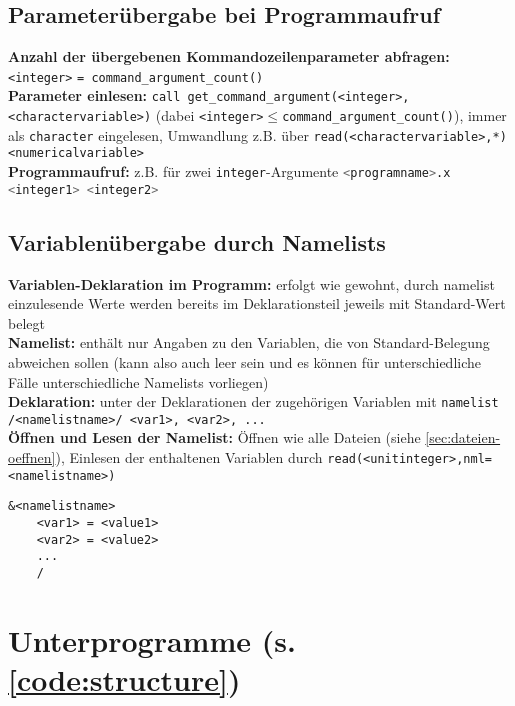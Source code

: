 \documentclass[a4paper, twocolumn]{scrarticle}
\begin{document}
\subsection{Parameterübergabe bei Programmaufruf}
\textbf{Anzahl der übergebenen Kommandozeilenparameter abfragen:} \lstinline|<integer>| \lstinline|= command_argument_count()|\\
\textbf{Parameter einlesen:} \lstinline|call get_command_argument(<integer>, <charactervariable>)| (dabei \lstinline|<integer>|$\leq$\lstinline|command_argument_count()|), immer als \lstinline|character| eingelesen, Umwandlung z.B. über \lstinline|read(<charactervariable>,*)| \lstinline|<numericalvariable>|\\
\textbf{Programmaufruf:} z.B. für zwei \lstinline|integer|-Argumente \lstinline[language=bash]|<programname>.x <integer1> <integer2>|

\subsection{Variablenübergabe durch Namelists}
\textbf{Variablen-Deklaration im Programm:} erfolgt wie gewohnt, durch namelist einzulesende Werte werden bereits im Deklarationsteil jeweils mit Standard-Wert belegt\\
\textbf{Namelist:} enthält nur Angaben zu den Variablen, die von Standard-Belegung abweichen sollen (kann also auch leer sein und es können für unterschiedliche Fälle unterschiedliche Namelists vorliegen)\\
\textbf{Deklaration:} unter der Deklarationen der zugehörigen Variablen mit \lstinline|namelist /<namelistname>/ <var1>, <var2>, ...|\\
\textbf{Öffnen und Lesen der Namelist:} Öffnen wie alle Dateien (siehe \cref{sec:dateien-oeffnen}), Einlesen der enthaltenen Variablen durch \lstinline|read(<unitinteger>,nml=<namelistname>)|
\begin{lstlisting}[caption={Struktur Namelist-Datei <namelistname>.nml}]
	&<namelistname>
	<var1> = <value1>
	<var2> = <value2>
	...
	/
\end{lstlisting}

\section{Unterprogramme (s. \cref{code:structure})}\label{sec:unterprogramme}
\end{document}
